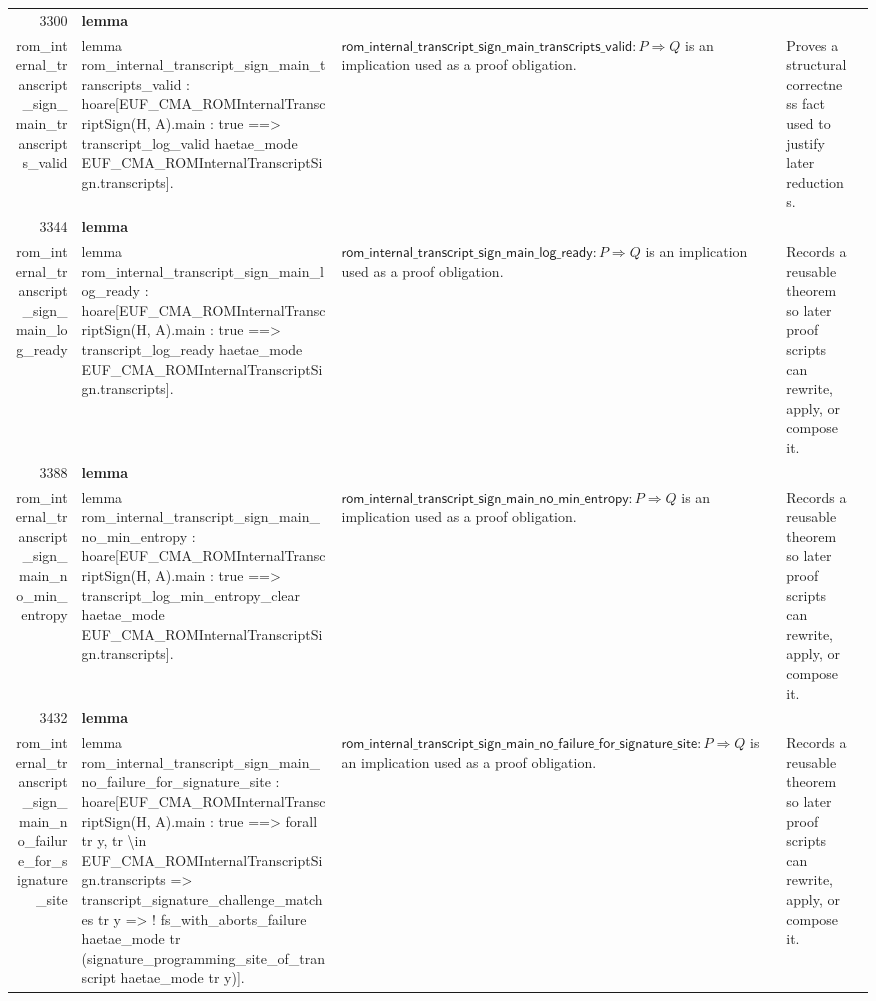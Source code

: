 \documentclass[10pt]{article}
\newcommand{\ec}[1]{\begingroup\ttfamily\scriptsize #1\endgroup}
\begin{document}
\begin{longtable}{r L{0.17\textwidth} L{0.26\textwidth} L{0.27\textwidth} L{0.20\textwidth}}
3300 & \textbf{lemma}\\\ec{rom\_internal\_transcript\_sign\_main\_transcripts\_valid} & \ec{lemma rom\_internal\_transcript\_sign\_main\_transcripts\_valid : hoare[EUF\_CMA\_ROMInternalTranscriptSign(H, A).main : true ==> transcript\_log\_valid haetae\_mode EUF\_CMA\_ROMInternalTranscriptSign.transcripts].} & \(\mathsf{rom\_internal\_transcript\_sign\_main\_transcripts\_valid} : P \Rightarrow Q\) is an implication used as a proof obligation. & Proves a structural correctness fact used to justify later reductions. \\
3344 & \textbf{lemma}\\\ec{rom\_internal\_transcript\_sign\_main\_log\_ready} & \ec{lemma rom\_internal\_transcript\_sign\_main\_log\_ready : hoare[EUF\_CMA\_ROMInternalTranscriptSign(H, A).main : true ==> transcript\_log\_ready haetae\_mode EUF\_CMA\_ROMInternalTranscriptSign.transcripts].} & \(\mathsf{rom\_internal\_transcript\_sign\_main\_log\_ready} : P \Rightarrow Q\) is an implication used as a proof obligation. & Records a reusable theorem so later proof scripts can rewrite, apply, or compose it. \\
3388 & \textbf{lemma}\\\ec{rom\_internal\_transcript\_sign\_main\_no\_min\_entropy} & \ec{lemma rom\_internal\_transcript\_sign\_main\_no\_min\_entropy : hoare[EUF\_CMA\_ROMInternalTranscriptSign(H, A).main : true ==> transcript\_log\_min\_entropy\_clear haetae\_mode EUF\_CMA\_ROMInternalTranscriptSign.transcripts].} & \(\mathsf{rom\_internal\_transcript\_sign\_main\_no\_min\_entropy} : P \Rightarrow Q\) is an implication used as a proof obligation. & Records a reusable theorem so later proof scripts can rewrite, apply, or compose it. \\
3432 & \textbf{lemma}\\\ec{rom\_internal\_transcript\_sign\_main\_no\_failure\_for\_signature\_site} & \ec{lemma rom\_internal\_transcript\_sign\_main\_no\_failure\_for\_signature\_site : hoare[EUF\_CMA\_ROMInternalTranscriptSign(H, A).main : true ==> forall tr y, tr \textbackslash{}in EUF\_CMA\_ROMInternalTranscriptSign.transcripts => transcript\_signature\_challenge\_matches tr y => ! fs\_with\_aborts\_failure haetae\_mode tr (signature\_programming\_site\_of\_transcript haetae\_mode tr y)].} & \(\mathsf{rom\_internal\_transcript\_sign\_main\_no\_failure\_for\_signature\_site} : P \Rightarrow Q\) is an implication used as a proof obligation. & Records a reusable theorem so later proof scripts can rewrite, apply, or compose it. \\

\end{longtable}
\end{document}
